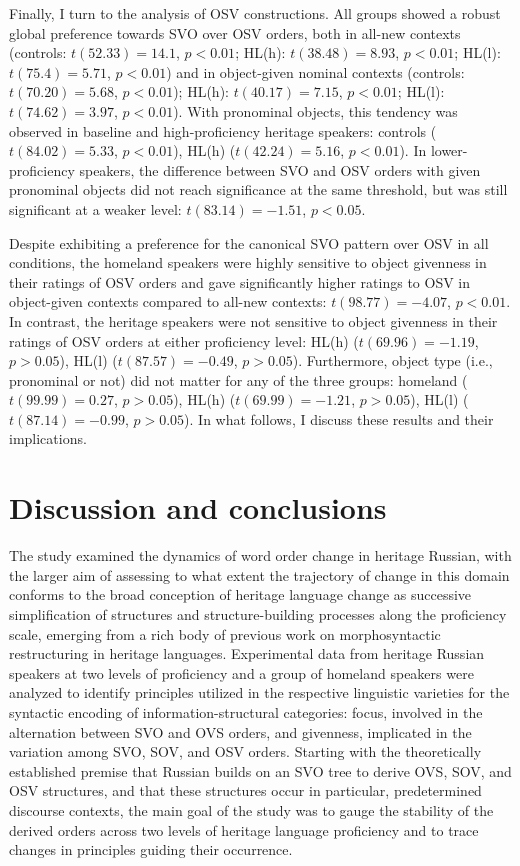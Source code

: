 \documentclass[output=paper]{langscibook}
\begin{document}
Finally, I turn to the analysis of OSV constructions. All groups showed a robust global preference towards SVO over OSV orders, both in all-new contexts (controls: $t(52.33) = 14.1$, $p < 0.01$; HL(h): $t(38.48) = 8.93$, $p < 0.01$; HL(l): $t(75.4) = 5.71$, $p < 0.01$) and in object-given nominal contexts (controls: $t(70.20) = 5.68$, $p < 0.01$); HL(h): $t(40.17) = 7.15$, $p < 0.01$; HL(l): $t(74.62) = 3.97$, $p < 0.01$). With pronominal objects, this tendency was observed in baseline and high-proficiency heritage speakers: controls ($t(84.02) = 5.33$, $p < 0.01$), HL(h) ($t(42.24) = 5.16$, $p < 0.01$). In lower-proficiency speakers, the difference between SVO and OSV orders with given pronominal objects did not reach significance at the same threshold, but was still significant at a weaker level: $t(83.14) = -1.51$, $p < 0.05$.

Despite exhibiting a preference for the canonical SVO pattern over OSV in all conditions, the homeland speakers were highly sensitive to object givenness in their ratings of OSV orders and gave significantly higher ratings to OSV in object-given contexts compared to all-new contexts: $t(98.77) = -4.07$, $p < 0.01$. In contrast, the heritage speakers were not sensitive to object givenness in their ratings of OSV orders at either proficiency level: HL(h) ($t(69.96) = -1.19$, $p > 0.05$), HL(l) ($t(87.57) = -0.49$, $p > 0.05$). Furthermore, object type (i.e., pronominal or not) did not matter for any of the three groups: homeland ($t(99.99) = 0.27$, $p > 0.05$), HL(h) ($t(69.99) = -1.21$, $p > 0.05$), HL(l) ($t(87.14) = -0.99$, $p > 0.05$). In what follows, I discuss these results and their implications.

\section{Discussion and conclusions}\label{sec:laleko:5}

The study examined the dynamics of word order change in heritage Russian, with the larger aim of assessing to what extent the trajectory of change in this domain conforms to the broad conception of heritage language change as successive simplification of structures and structure-building processes along the proficiency scale, emerging from a rich body of previous work on morphosyntactic restructuring in heritage languages. Experimental data from heritage Russian speakers at two levels of proficiency and a group of homeland speakers were analyzed to identify principles utilized in the respective linguistic varieties for the syntactic encoding of information-structural categories: focus, involved in the alternation between SVO and OVS orders, and givenness, implicated in the variation among SVO, SOV, and OSV orders. Starting with the theoretically established premise that Russian builds on an SVO tree to derive OVS, SOV, and OSV structures, and that these structures occur in particular, predetermined discourse contexts, the main goal of the study was to gauge the stability of the derived orders across two levels of heritage language proficiency and to trace changes in principles guiding their occurrence.
\end{document}
